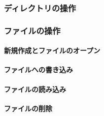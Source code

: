 
\subsubsection{ディレクトリの操作}

\subsubsection{ファイルの操作}
\paragraph{新規作成とファイルのオープン}

\paragraph{ファイルへの書き込み}

\paragraph{ファイルの読み込み}

\paragraph{ファイルの削除}

